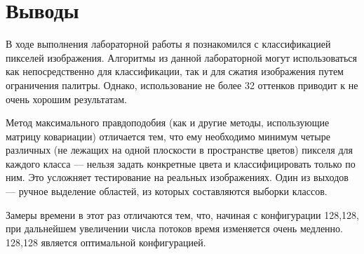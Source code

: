 \section{Выводы}
В ходе выполнения лабораторной работы я познакомился с классификацией пикселей изображения. Алгоритмы из данной лабораторной могут использоваться как непосредственно для классификации, так и для сжатия изображения путем ограничения палитры. Однако, использование не более 32 оттенков приводит к не очень хорошим результатам.

Метод максимального правдоподобия (как и другие методы, использующие матрицу ковариации) отличается тем, что ему необходимо минимум четыре различных (не лежащих на одной плоскости в пространстве цветов) пикселя для каждого класса --- нельзя задать конкретные цвета и классифицировать только по ним. Это усложняет тестирование на реальных изображениях. Один из выходов --- ручное выделение областей, из которых составляются выборки классов.

Замеры времени в этот раз отличаются тем, что, начиная с конфигурации 128,128, при дальнейшем увеличении числа потоков время изменяется очень медленно. 128,128 является оптимальной конфигурацией.

\pagebreak
